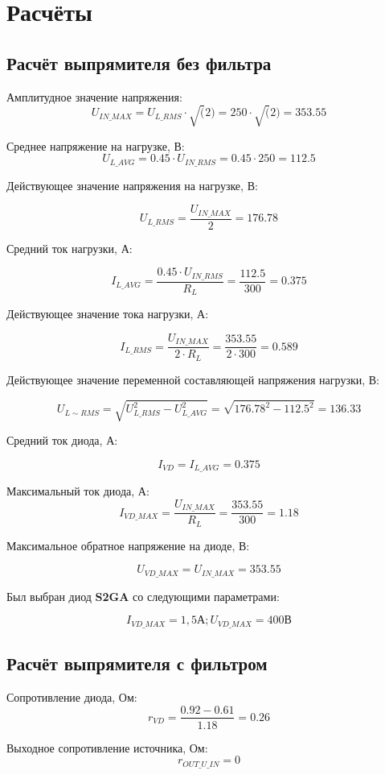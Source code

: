 \chapter{Расчёты}

    \section{Расчёт выпрямителя без фильтра}
    
    Амплитудное значение напряжения:
    \[
    U_{IN\_MAX} = U_{L\_RMS} \cdot \sqrt(2) = 250 \cdot \sqrt(2) = 353.55
    \]
    
Среднее напряжение на нагрузке, В:
\[
U_{L\_AVG}=0.45 \cdot U_{IN\_RMS} = 0.45 \cdot 250 = 112.5
\]

Действующее значение напряжения на нагрузке, В:

\[
U_{L\_RMS} = \frac{U_{IN\_MAX}}{2} = 176.78
\]

Средний ток нагрузки, А:

\[
I_{L\_AVG} = \frac{0.45 \cdot U_{IN\_RMS}}{R_L}= \frac{112.5}{300} = 0.375
\]

Действующее значение тока нагрузки, А:

\[
I_{L\_RMS} = \frac{U_{IN\_MAX}}{2 \cdot R_L}=\frac{353.55}{2 \cdot 300} = 0.589
\]

Действующее значение переменной составляющей напряжения нагрузки, В:

\[
U_{L\sim RMS} = \sqrt{U_{L\_RMS}^2-U_{L\_AVG}^2} = \sqrt{176.78^2-112.5^2}=136.33
\]

Средний ток диода, А:

\[
I_{VD}=I_{L\_AVG} = 0.375
\]

Максимальный ток диода, А:
\[
I_{VD\_MAX}=\frac{U_{IN\_MAX}}{R_L}=\frac{353.55}{300}=1.18
\]

Максимальное обратное напряжение на диоде, В:

\[
U_{VD\_MAX}=U_{IN\_MAX}=353.55
\]


Был выбран диод \textbf{S2GA} со следующими параметрами:

\[
I_{VD\_MAX} = 1,5 \text{А} ;
U_{VD\_MAX} = 400 \text{В}
\]

\section{Расчёт выпрямителя с фильтром}
Сопротивление диода, Ом:
\[
r_{VD} = \frac{0.92-0.61}{1.18}=0.26
\]

Выходное сопротивление источника, Ом:
\[
r_{OUT\_U\_IN}=0
\]

